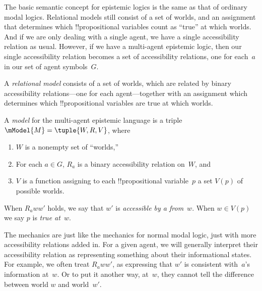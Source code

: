\documentclass[../../../include/open-logic-section]{subfiles}
\begin{document}


The basic semantic concept for epistemic logics is the same as that of
ordinary modal logics. Relational models still consist of a set of
worlds, and an assignment that determines which !!{propositional
variable}s count as ``true'' at which worlds. And if we are only
dealing with a single agent, we have a single accessibility relation
as usual. However, if we have a multi-agent epistemic logic, then our
single accessibility relation becomes a set of accessibility
relations, one for each~$a$ in our set of agent symbols~$G$.

A \emph{relational model} consists of a set of worlds, which are
related by binary accessibility relations---one for each
agent---together with an assignment which determines which
!!{propositional variable}s are true at which worlds.

\begin{defn}
  A \emph{model} for the multi-agent epistemic language is a triple
  $\mModel{M} = \tuple{W, R, V}$, where
  \begin{enumerate}
  \item $W$ is a nonempty set of ``worlds,''
  \item For each $a \in G$, ${R}_a$ is a binary accessibility relation
  on~$W$, and
  \item $V$ is a function assigning to each !!{propositional
    variable}~$p$ a set $V(p)$ of possible worlds.
  \end{enumerate}
  When $R_a ww'$ holds, we say that $w'$ is \emph{accessible by a
    from}~$w$. When $w \in V(p)$ we say $p$ is \emph{true at}~$w$.
\end{defn}

The mechanics are just like the mechanics for normal modal logic, just
with more accessibility relations added in. For a given agent, we will
generally interpret their accessibility relation as representing
something about their informational states. For example, we often
treat $R_a ww'$, as expressing that $w'$ is consistent with~$a$'s
information at~$w$. Or to put it another way, at~$w$, they cannot tell
the difference between world $w$ and world~$w'$.  
\end{document}

